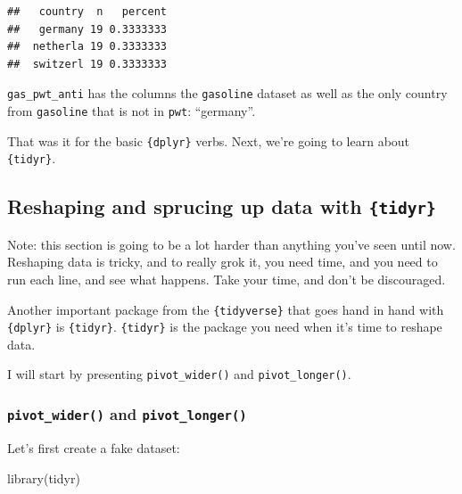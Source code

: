 \documentclass[
]{article}
\newenvironment{Shaded}{\begin{snugshade}}{\end{snugshade}}
\newcommand{\FunctionTok}[1]{\textcolor[rgb]{0.00,0.00,0.00}{#1}}
\newcommand{\NormalTok}[1]{#1}
\begin{document}
\begin{verbatim}
##   country  n   percent
##   germany 19 0.3333333
##  netherla 19 0.3333333
##  switzerl 19 0.3333333
\end{verbatim}

\texttt{gas\_pwt\_anti} has the columns the \texttt{gasoline} dataset as well as the only country from \texttt{gasoline}
that is not in \texttt{pwt}: ``germany''.

That was it for the basic \texttt{\{dplyr\}} verbs. Next, we're going to learn about \texttt{\{tidyr\}}.

\hypertarget{reshaping-and-sprucing-up-data-with-tidyr}{%
\subsection{\texorpdfstring{Reshaping and sprucing up data with \texttt{\{tidyr\}}}{Reshaping and sprucing up data with \{tidyr\}}}\label{reshaping-and-sprucing-up-data-with-tidyr}}

Note: this section is going to be a lot harder than anything you've seen until now. Reshaping
data is tricky, and to really grok it, you need time, and you need to run each line, and see what
happens. Take your time, and don't be discouraged.

Another important package from the \texttt{\{tidyverse\}} that goes hand in hand with \texttt{\{dplyr\}} is \texttt{\{tidyr\}}.
\texttt{\{tidyr\}} is the package you need when it's time to reshape data.

I will start by presenting \texttt{pivot\_wider()} and \texttt{pivot\_longer()}.

\hypertarget{pivot_wider-and-pivot_longer}{%
\subsubsection{\texorpdfstring{\texttt{pivot\_wider()} and \texttt{pivot\_longer()}}{pivot\_wider() and pivot\_longer()}}\label{pivot_wider-and-pivot_longer}}

Let's first create a fake dataset:

\begin{Shaded}
\begin{Highlighting}[]
\FunctionTok{library}\NormalTok{(tidyr)}
\end{Highlighting}
\end{Shaded}
\end{document}

